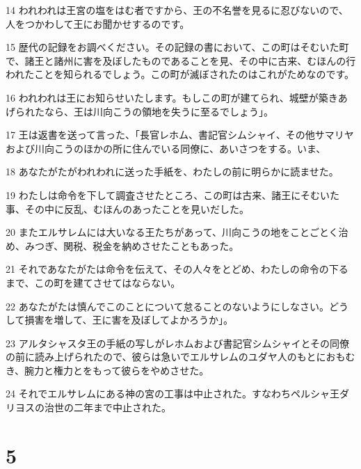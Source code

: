 \par 14 われわれは王宮の塩をはむ者ですから、王の不名誉を見るに忍びないので、人をつかわして王にお聞かせするのです。
\par 15 歴代の記録をお調べください。その記録の書において、この町はそむいた町で、諸王と諸州に害を及ぼしたものであることを見、その中に古来、むほんの行われたことを知られるでしょう。この町が滅ぼされたのはこれがためなのです。
\par 16 われわれは王にお知らせいたします。もしこの町が建てられ、城壁が築きあげられたなら、王は川向こうの領地を失うに至るでしょう」。
\par 17 王は返書を送って言った、「長官レホム、書記官シムシャイ、その他サマリヤおよび川向こうのほかの所に住んでいる同僚に、あいさつをする。いま、
\par 18 あなたがたがわれわれに送った手紙を、わたしの前に明らかに読ませた。
\par 19 わたしは命令を下して調査させたところ、この町は古来、諸王にそむいた事、その中に反乱、むほんのあったことを見いだした。
\par 20 またエルサレムには大いなる王たちがあって、川向こうの地をことごとく治め、みつぎ、関税、税金を納めさせたこともあった。
\par 21 それであなたがたは命令を伝えて、その人々をとどめ、わたしの命令の下るまで、この町を建てさせてはならない。
\par 22 あなたがたは慎んでこのことについて怠ることのないようにしなさい。どうして損害を増して、王に害を及ぼしてよかろうか」。
\par 23 アルタシャスタ王の手紙の写しがレホムおよび書記官シムシャイとその同僚の前に読み上げられたので、彼らは急いでエルサレムのユダヤ人のもとにおもむき、腕力と権力とをもって彼らをやめさせた。
\par 24 それでエルサレムにある神の宮の工事は中止された。すなわちペルシャ王ダリヨスの治世の二年まで中止された。

\chapter{5}

